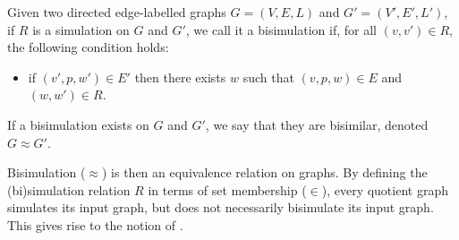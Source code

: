 \begin{definition}[Bisimulation]
    Given two directed edge-labelled graphs $G = (V, E, L)$ and $G' = (V', E', L')$, if $R$ is a simulation on $G$ and $G'$, we call it a bisimulation if, for all $(v, v') \in R$, the following condition holds:
    \begin{itemize}
        \item if $(v', p, w') \in E'$ then there exists $w$ such that $(v, p, w) \in E$ and $(w, w') \in R$.
    \end{itemize}
    If a bisimulation exists on $G$ and $G'$, we say that they are bisimilar, denoted $G \approx G'$.
\end{definition}
Bisimulation ($\approx$) is then an equivalence relation on graphs. By defining the (bi)simulation relation $R$ in terms of set membership ($\in$), every quotient graph simulates its input graph, but does not necessarily bisimulate its input graph. This gives rise to the notion of .




